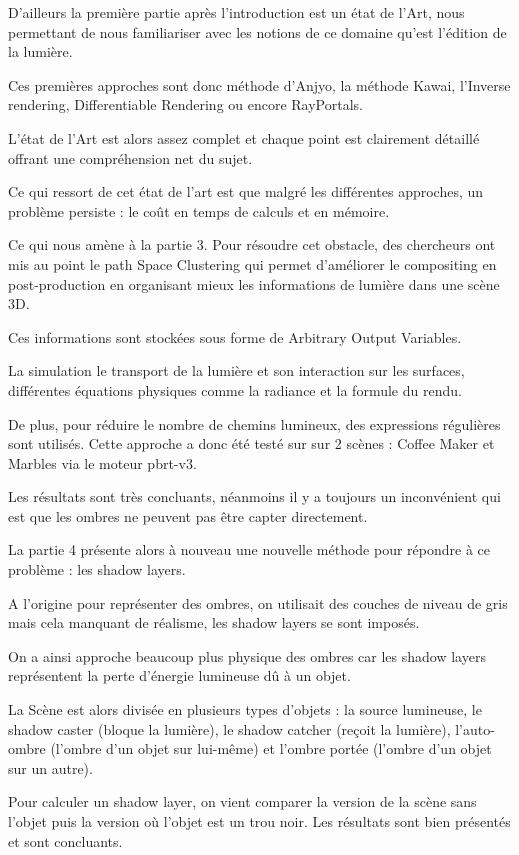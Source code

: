 \documentclass{article}
\begin{document}
D’ailleurs la première partie après l’introduction est un état de l’Art, nous permettant de nous familiariser avec les notions de ce domaine qu’est l’édition de la lumière.

Ces premières approches sont donc méthode d’Anjyo, la méthode Kawai, l’Inverse rendering, Differentiable Rendering ou encore RayPortals.

L’état de l’Art est alors assez complet et chaque point est clairement détaillé offrant une compréhension net du sujet.

Ce qui ressort de cet état de l’art est que malgré les différentes approches, un problème persiste : le coût en temps de calculs et en mémoire.

Ce qui nous amène à la partie 3. Pour résoudre cet obstacle, des chercheurs ont mis au point le path Space Clustering qui permet d’améliorer le compositing en post-production en organisant mieux les informations de lumière dans une scène 3D.

Ces informations sont stockées sous forme de Arbitrary Output Variables.

La simulation le transport de la lumière et son interaction sur les surfaces, différentes équations physiques comme la radiance et la formule du rendu.

De plus, pour réduire le nombre de chemins lumineux, des expressions régulières sont utilisés. Cette approche a donc été testé sur sur 2 scènes : Coffee Maker et Marbles via le moteur pbrt-v3.

Les résultats sont très concluants, néanmoins il y a toujours un inconvénient qui est que les ombres ne peuvent pas être capter directement.

La partie 4 présente alors à nouveau une nouvelle méthode pour répondre à ce problème : les shadow layers.

A l’origine pour représenter des ombres, on utilisait des couches de niveau de gris mais cela manquant de réalisme, les shadow layers se sont imposés.

On a ainsi approche beaucoup plus physique des ombres car les shadow layers représentent la perte d’énergie lumineuse dû à un objet.

La Scène est alors divisée en plusieurs types d’objets : la source lumineuse, le shadow caster (bloque la lumière), le shadow catcher (reçoit la lumière), l’auto-ombre (l’ombre d’un objet sur lui-même) et l’ombre portée (l’ombre d’un objet sur un autre).

Pour calculer un shadow layer, on vient comparer la version de la scène sans l’objet puis la version où l’objet est un trou noir. Les résultats sont bien présentés et sont concluants.
\end{document}
